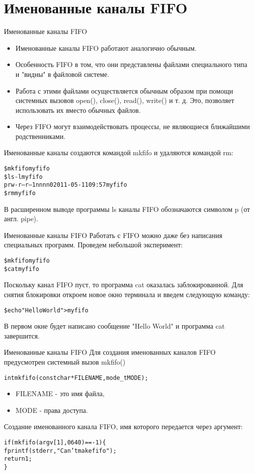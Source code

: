 \documentclass{beamer}
\begin{document}
\section{Именованные каналы FIFO}

\begin{frame}[fragile]{Именованные каналы FIFO}
\begin{itemize}
\item Именованные каналы FIFO работают аналогично обычным. 
\item Особенность FIFO в том, что они представлены файлами специального типа и "видны" в файловой системе. 
\item Работа с этими файлами осуществляется обычным образом при помощи системных вызовов open(), close(), read(), write() и т. д. Это, позволяет использовать их вместо обычных файлов. 
\item Через FIFO могут взаимодействовать процессы, не являющиеся ближайшими родственниками.
\end{itemize}

Именованные каналы создаются командой mkfifo и удаляются командой rm:
\begin{alltt}
\$ mkfifo myfifo
\$ ls -l myfifo
prw-r--r-- 1 nn nn 0 2011-05-11 09:57 myfifo
\$ rm myfifo
\end{alltt}
В расширенном выводе программы ls каналы FIFO обозначаются символом p (от англ. pipe). 
\end{frame}

\begin{frame}[fragile]{Именованные каналы FIFO}
Работать с FIFO можно даже без написания специальных программ. Проведем небольшой эксперимент:
\begin{alltt}
\$ mkfifo myfifo
\$ cat myfifo
\end{alltt}
Поскольку канал FIFO пуст, то программа cat оказалась заблокированной. Для снятия блокировки откроем новое окно терминала и введем следующую команду:
\begin{alltt}
\$ echo "Hello World" > myfifo
\end{alltt}
В первом окне будет написано сообщение "Hello World" и программа cat завершится.
\end{frame}

\begin{frame}[fragile]{Именованные каналы FIFO}
Для создания именованных каналов FIFO предусмотрен системный вызов mkfifo()
\begin{alltt}
int mkfifo (const char * FILENAME, mode_t MODE);
\end{alltt}
\begin{itemize}
\item FILENAME - это имя файла, 
\item MODE - права доступа. 
\end{itemize}

Создание именованного канала FIFO, имя которого передается через аргумент:
\begin{alltt}
if (mkfifo (argv[1], 0640) == -1) \{
  fprintf (stderr, "Can't make fifo");
  return 1;
\}
\end{alltt}
\end{frame}
\end{document}
